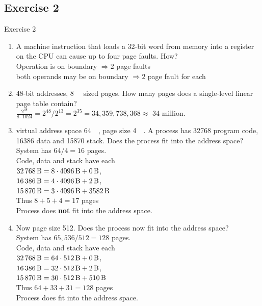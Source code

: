 \documentclass[10pt]{beamer}
\begin{document}
\subsection*{Exercise 2}
\frame{\subsectionpage}
\begin{frame}{Exercise 2}
    	\begin{enumerate}
		\item A machine instruction that loads a 32-bit word from memory into a register on the CPU can cause up to four page faults. How? \\ \vspace{0.3cm}
		\alert{Operation is on boundary $\Rightarrow 2$ page faults \\
                both operands may be on boundary $\Rightarrow 2$ page fault for each}
		\item%
			48-bit addresses, \SI{8}{\kibi\byte} sized pages.
			How many pages does a single-level linear page table contain? \\ \vspace{0.3cm}
			\alert{ $\frac{2^{48}}{8\cdot1024} = 2^{48} / 2^{13} = 2^{35} = 34,359,738,368 \approx$ 34 million.}
			\framebreak
		\item%
			virtual address space \SI{64}{\kibi\byte}, page size \SI{4}{\kibi\byte}.
			A process has \SI{32768}{\byte} program code, \SI{16386}{\byte} data and \SI{15870}{\byte} stack.
			Does the process fit into the address space? \\ \vspace{0.5cm}
			\alert{System has $64 / 4 = 16$ pages.\\
			Code, data and stack have each \\
			$\SI{32768}{\byte} = 8 \cdot \SI{4096}{\byte} + \SI{0}{\byte}$, \\
			$\SI{16386}{\byte} = 4 \cdot \SI{4096}{\byte} + \SI{2}{\byte}$, \\
			$\SI{15870}{\byte} = 3 \cdot \SI{4096}{\byte} + \SI{3582}{\byte}$ \\
			Thus $8 + 5 + 4 = 17$ pages \\
			Process does \textbf{not} fit into the address space.
			}
			\framebreak
		\item%
			Now page size \SI{512}{\byte}.
			Does the process now fit into the address space? \\ \vspace{0.5cm}
			\alert{System has $65,536 / 512 = 128$ pages.\\
			Code, data and stack have each \\
			$\SI{32768}{\byte} = 64 \cdot \SI{512}{\byte} + \SI{0}{\byte}$, \\
			$\SI{16386}{\byte} = 32 \cdot \SI{512}{\byte} + \SI{2}{\byte}$, \\
			$\SI{15870}{\byte} = 30 \cdot \SI{512}{\byte} + \SI{510}{\byte}$ \\
			Thus $64 + 33 + 31 = 128$ pages \\
			Process does fit into the address space.
			}
	\end{enumerate}
\end{frame}
\end{document}
